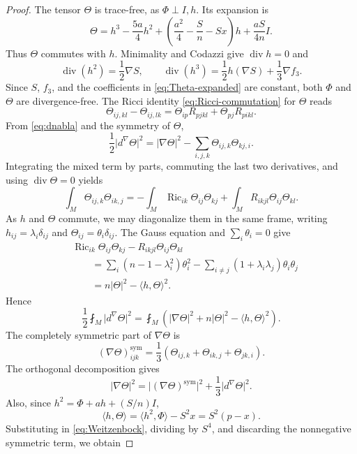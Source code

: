 \documentclass[10pt,a4paper]{amsart}
\numberwithin{equation}{section}
\newcommand{\Ric}{\operatorname{Ric}}
\newcommand{\diver}{\operatorname{div}}
\newcommand{\ip}[2]{\langle #1,#2\rangle}
\newcommand{\norm}[1]{\lvert #1\rvert}
\begin{document}
\begin{proof}
The tensor $\Theta$ is trace-free, as $\Phi\perp I,h$. Its expansion is
\begin{equation}\label{eq:Theta-expanded}
\Theta=h^3-\frac{5a}{4}h^2
+\left(\frac{a^2}{4}-\frac Sn-Sx\right)h
+\frac{aS}{4n}I.
\end{equation}
Thus $\Theta$ commutes with $h$. Minimality and Codazzi give $\diver h=0$ and
\[
\diver(h^2)=\frac12\nabla S,
\qquad
\diver(h^3)=\frac12h(\nabla S)+\frac13\nabla f_3.
\]
Since $S$, $f_3$, and the coefficients in \eqref{eq:Theta-expanded} are constant, both $\Phi$ and $\Theta$ are divergence-free.
The Ricci identity \eqref{eq:Ricci-commutation} for $\Theta$ reads
\[
\Theta_{ij,kl}-\Theta_{ij,lk}
=\Theta_{ip}R_{pjkl}+\Theta_{pj}R_{pikl}.
\]
From \eqref{eq:dnabla} and the symmetry of $\Theta$,
\[
\frac12\norm{d^\nabla\Theta}^2
=\norm{\nabla\Theta}^2
-\sum_{i,j,k}\Theta_{ij,k}\Theta_{kj,i}.
\]
Integrating the mixed term by parts, commuting the last two derivatives, and using $\diver\Theta=0$ yields
\[
\int_M \Theta_{ij,k}\Theta_{ik,j}
=-\int_M\Ric_{ik}\Theta_{ij}\Theta_{kj}
+\int_M R_{ikjl}\Theta_{ij}\Theta_{kl}.
\]
As $h$ and $\Theta$ commute, we may diagonalize them in the same frame, writing
$h_{ij}=\lambda_i\delta_{ij}$ and $\Theta_{ij}=\theta_i\delta_{ij}$. The Gauss equation and $\sum_i\theta_i=0$ give
\begin{align*}
&\Ric_{ik}\Theta_{ij}\Theta_{kj}-R_{ikjl}\Theta_{ij}\Theta_{kl}\\
&\qquad=\sum_i(n-1-\lambda_i^2)\theta_i^2
-\sum_{i\ne j}(1+\lambda_i\lambda_j)\theta_i\theta_j\\
&\qquad=n\norm\Theta^2-\ip{h}{\Theta}^2.
\end{align*}
Hence
\begin{equation}\label{eq:Weitzenbock}
\frac12\fint_M\norm{d^\nabla\Theta}^2
=\fint_M\left(\norm{\nabla\Theta}^2+n\norm\Theta^2-\ip{h}{\Theta}^2\right).
\end{equation}
The completely symmetric part of $\nabla\Theta$ is
\[
(\nabla\Theta)^{\mathrm{sym}}_{ijk}
=\frac13(\Theta_{ij,k}+\Theta_{ik,j}+\Theta_{jk,i}).
\]
The orthogonal decomposition gives
\[
\norm{\nabla\Theta}^2
=\norm{(\nabla\Theta)^{\mathrm{sym}}}^2
+\frac13\norm{d^\nabla\Theta}^2.
\]
Also, since $h^2=\Phi+ah+(S/n)I$,
\begin{equation}\label{eq:hTheta}
\ip h\Theta=\ip{h^2}{\Phi}-S^2x=S^2(p-x).
\end{equation}
Substituting in \eqref{eq:Weitzenbock}, dividing by $S^4$, and discarding the nonnegative symmetric term, we obtain

\end{proof}
\end{document}
